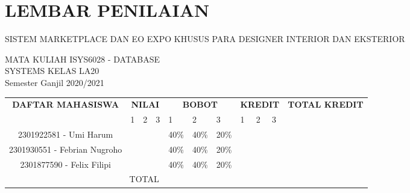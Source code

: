 \bgroup
\titleformat{\chapter}{\filcenter}{}{0pt}{\normalfont\Large\bfseries}  %
\titlespacing{\chapter}{0pt}{\parskip}{-\parskip}
\chapter*{LEMBAR PENILAIAN}
\thispagestyle{empty}
\begin{center}
	\Large
	SISTEM MARKETPLACE DAN EO EXPO KHUSUS PARA DESIGNER INTERIOR DAN EKSTERIOR
	
	\vspace{0.8cm}
	MATA KULIAH ISYS6028 - DATABASE \\
	SYSTEMS KELAS LA20 \\
	\vspace{0.8cm}
	Semester Ganjil 2020/2021
	
	\vspace{0.9cm}
	\renewcommand{\arraystretch}{1.6}
	\small
	\begin{tabular}{| c | p{0.42cm} | p{0.42cm} | p{0.42cm} | p{0.42cm} | p{0.42cm} | p{0.42cm} | p{0.42cm} | p{0.42cm} | p{0.42cm} | p{1.5cm} |}
		\hline
		\multirow{2}{*}{\textbf{DAFTAR MAHASISWA}} & \multicolumn{3}{|c|}{\textbf{NILAI}} & \multicolumn{3}{|c|}{\textbf{BOBOT}} & \multicolumn{3}{|c|}{\textbf{KREDIT}} & \multirow{2}{*}{\parbox{1.5cm}{\textbf{TOTAL KREDIT}}}\\ \cline{2-10}
			& \hfil 1 & 2 & 3 & 1 & 2 & 3 & 1 & 2 & 3 & \\[6pt] \hline
		
		2301922581 - Umi Harum & & & & 40\% & 40\% & 20\% & & & & \\ \hline
		2301930551 - Febrian Nugroho & & & & 40\% & 40\% & 20\% & & & & \\ \hline
		2301877590 - Felix Filipi & & & & 40\% & 40\% & 20\% & & & & \\ \hline
		\multicolumn{10}{|c|}{TOTAL} & \\ \hline
	\end{tabular}
\end{center}
